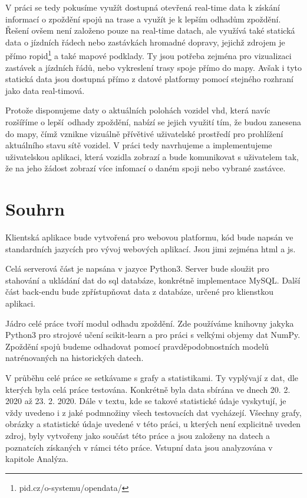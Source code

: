 \bigbreak

V práci se tedy pokusíme využít dostupná otevřená real-time data k získání informací o zpoždění spojů na trase a využít je k lepším odhadům zpoždění. Řešení ovšem není založeno pouze na real-time datach, ale využívá také statická data o jízdních řádech nebo zastávkách hromadné dopravy, jejichž zdrojem je přímo \gls{ropid}\footnote{pid.cz/o-systemu/opendata/} a také mapové podklady. Ty jsou potřeba zejména pro vizualizaci zastávek a jízdních řádů, nebo vykreslení trasy spoje přímo do mapy. Avšak i tyto statická data jsou dostupná přímo z datové platformy pomocí stejného rozhraní jako data real-timová.

\bigbreak

Protože disponujeme daty o aktuálních polohách vozidel \gls{vhd}, která navíc rozšíříme o lepší odhady zpoždění, nabízí se jejich využití tím, že budou zanesena do mapy, čímž vznikne vizuálně přívětivé uživatelské prostředí pro prohlížení aktuálního stavu sítě vozidel. V práci tedy navrhujeme a implementujeme uživatelskou aplikaci, která vozidla zobrazí a bude komunikovat s uživatelem tak, že na jeho žádost zobrazí více infomací o daném spoji nebo vybrané zastávce.

\section*{Souhrn}

Klientská aplikace bude vytvořená pro webovou platformu, kód bude napsán ve standardních jazycích pro vývoj webových aplikací. Jsou jimi zejména \gls{html} a \gls{js}.

\bigbreak

Celá serverová část je napsána v jazyce Python3. Server bude sloužit pro stahování a ukládání dat do \gls{sql} databáze, konkrétně implementace MySQL. Další část back-endu bude zpřístupňovat data z databáze, určené pro klienstkou aplikaci.

\bigbreak

Jádro celé práce tvoří modul odhadu zpoždění. Zde používáme knihovny jakyka Python3 pro strojové učení scikit-learn a pro práci s velkými objemy dat NumPy. Zpoždění spojů budeme odhadovat pomocí pravděpodobnostních modelů natrénovaných na historických datech.

\bigbreak

V průběhu celé práce se setkávame s grafy a statistikami. Ty vyplývají z dat, dle kterých byla celá práce testována. Konkrétně byla data sbírána ve dnech 20. 2. 2020 až 23. 2. 2020. Dále v textu, kde se takové statistické údaje vyskytují, je vždy uvedeno i z jaké podmnožiny všech testovacích dat vycházejí. Všechny grafy, obrázky a statistické údaje uvedené v této práci, u kterých není explicitně uveden zdroj, byly vytvořeny jako součást této práce a jsou založeny na datech a poznatcích získaných v rámci této práce. Vstupní data jsou analyzována v kapitole Analýza.

